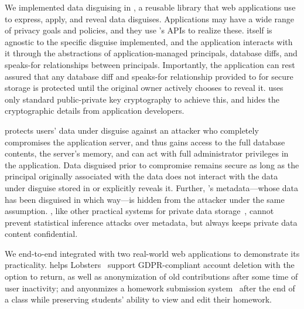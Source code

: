 %
We implemented data disguising in \sys, a reusable library that
web applications use to express, apply, and reveal data disguises.
%
Applications may have a wide range of privacy goals and policies, and they
use \sys's APIs to realize these.
%
\sys itself is agnostic to the specific disguise implemented, and the
application interacts with it through the abstractions of application-managed
principals, database diffs, and speaks-for relationships between principals.
%
Importantly, the application can rest assured that any database diff
and speaks-for relationship provided to \sys for secure storage is protected
until the original owner actively chooses to reveal it.
%
\sys uses only standard public-private key cryptography to achieve this, and
hides the cryptographic details from application developers.
%

%
%
\sys protects users' data under disguise against an attacker who completely
compromises the application server, and thus gains access to the full database
contents, the server's memory, and can act with full administrator privileges
in the application.
%
Data disguised prior to compromise remains secure as long as the principal
originally associated with the data does not interact with the data under
disguise stored in \sys or explicitly reveals it.
%
Further, \sys's metadata---\eg whose data has been disguised in which way---is
hidden from the attacker under the same assumption.
%
\sys, like other practical systems for private data storage~\cite{cryptdb, mylar,
keybase}, cannot prevent statistical inference attacks over metadata, but always
keeps private data content confidential.
%

%
%
We end-to-end integrated \sys with two real-world web applications to demonstrate
its practicality.
%
\sys helps Lobsters~\cite{lobsters} support GDPR-compliant account deletion with
the option to return, as well as anonymization of old contributions after some
time of user inactivity; and \sys anyonmizes a homework submission
system~\cite{websubmit-rs-anon} after the end of a class while preserving
students' ability to view and edit their homework.
%

